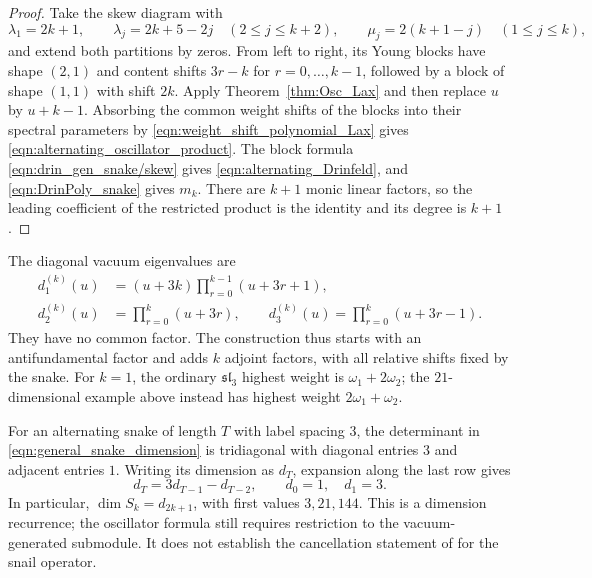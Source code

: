 \documentclass[12pt,reqno]{amsart}
\numberwithin{equation}{section}
\begin{document}
\begin{proof}
Take the skew diagram with
\begin{equation*}
    \lambda_1=2k+1,\qquad
    \lambda_j=2k+5-2j\quad(2\leq j\leq k+2),\qquad
    \mu_j=2(k+1-j)\quad(1\leq j\leq k),
\end{equation*}
and extend both partitions by zeros. From left to right, its
Young blocks have shape $(2,1)$ and content shifts $3r-k$ for
$r=0,\ldots,k-1$, followed by a block of shape $(1,1)$ with
shift $2k$. Apply Theorem~\ref{thm:Osc_Lax} and then replace
$u$ by $u+k-1$. Absorbing the common weight shifts of the blocks
into their spectral parameters by \eqref{eqn:weight_shift_polynomial_Lax}
gives \eqref{eqn:alternating_oscillator_product}.
The block formula \eqref{eqn:drin_gen_snake/skew} gives
\eqref{eqn:alternating_Drinfeld}, and
\eqref{eqn:DrinPoly_snake} gives $m_k$. There are $k+1$ monic
linear factors, so the leading coefficient of the restricted
product is the identity and its degree is $k+1$.
\end{proof}

The diagonal vacuum eigenvalues are
\begin{align*}
    d_1^{(k)}(u)&=(u+3k)\prod_{r=0}^{k-1}(u+3r+1),\\
    d_2^{(k)}(u)&=\prod_{r=0}^{k}(u+3r),\qquad
    d_3^{(k)}(u)=\prod_{r=0}^{k}(u+3r-1).
\end{align*}
They have no common factor. The construction thus starts with
an antifundamental factor and adds $k$ adjoint factors, with all
relative shifts fixed by the snake. For $k=1$, the ordinary
$\mathfrak{sl}_3$ highest weight is $\omega_1+2\omega_2$;
the $21$-dimensional example above instead has highest weight
$2\omega_1+\omega_2$.

For an alternating snake of length $T$ with label spacing $3$,
the determinant in \eqref{eqn:general_snake_dimension} is
tridiagonal with diagonal entries $3$ and adjacent entries $1$.
Writing its dimension as $d_T$, expansion along the last row gives
\begin{equation}
    d_T=3d_{T-1}-d_{T-2},\qquad d_0=1,\quad d_1=3.
    \label{eqn:alternating_dimension_recurrence}
\end{equation}
In particular, $\dim S_k=d_{2k+1}$, with first values
$3,21,144$. This is a dimension recurrence; the oscillator
formula still requires restriction to the vacuum-generated
submodule. It does not establish the cancellation statement
of \cite[Conjecture~4.17]{JuergensBoos2025} for the snail operator.
\end{document}
